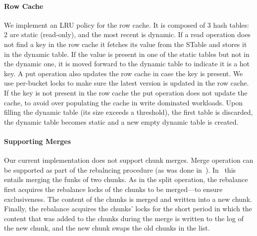 \paragraph{Row Cache} We implement an LRU policy for the row cache. It is composed of 3 hash tables: 2 are static (read-only), and the most recent is dynamic. If a read operation does not find a key in the row cache it fetches its value from the STable and stores it in the dynamic table. If the value is present in one of the static tables but not in the dynamic one, it is moved forward to the dynamic table to indicate it is a hot key. A put operation also updates the row cache in case the key is present. We use per-bucket locks to make sure the latest version is updated in the row cache. If the key is not present in the row cache the put operation does not update the cache, to avoid over populating the cache in write dominated workloads. Upon filling the dynamic table (its size exceeds a threshold), the first table is discarded, the dynamic table becomes static and a new empty dynamic table is created.

\paragraph{Supporting Merges}
Our current implementation does not support chunk merges. Merge operation can be supported as part of the rebalncing procedure (as was done in~\cite{kiwi}). In \sys\ this entails merging the funks of two chunks. As in the split operation, the rebalance first acquires the  rebalance locks of the chunks to be merged---to ensure exclusiveness. The content of the chunks is merged and written into a new chunk. Finally, the rebalance acquires the chunks' locks for the short period in which the content that was added to the chunks during the merge is written to the log of the new chunk, and the new chunk swaps the old chunks in the list.
